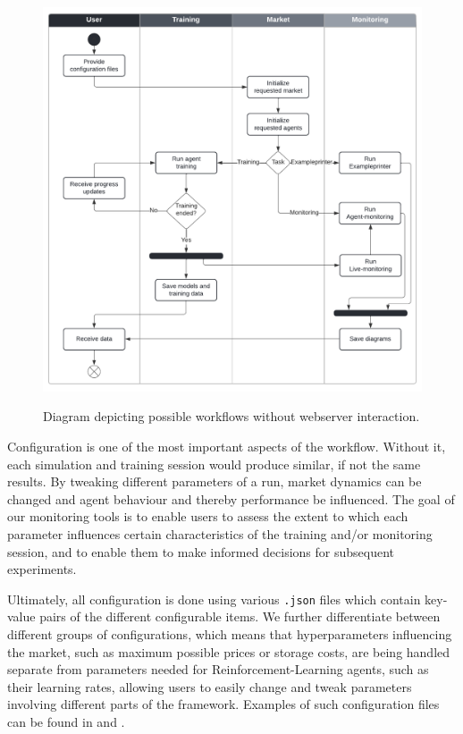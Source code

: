 \begin{figure}[t]
	\centering
	\includegraphics[width = \textwidth]{images/workflow_swimlanes.pdf}\\
	\caption{Diagram depicting possible workflows without webserver interaction.}\label{fig:WorkflowSwimlanes}
\end{figure}

Configuration is one of the most important aspects of the workflow. Without it, each simulation and training session would produce similar, if not the same results. By tweaking different parameters of a run, market dynamics can be changed and agent behaviour and thereby performance be influenced. The goal of our monitoring tools is to enable users to assess the extent to which each parameter influences certain characteristics of the training and/or monitoring session, and to enable them to make informed decisions for subsequent experiments.

Ultimately, all configuration is done using various \texttt{.json} files which contain key-value pairs of the different configurable items. We further differentiate between different groups of configurations, which means that hyperparameters influencing the market, such as maximum possible prices or storage costs, are being handled separate from parameters needed for Reinforcement-Learning agents, such as their learning rates, allowing users to easily change and tweak parameters involving different parts of the framework. Examples of such configuration files can be found in  and .

